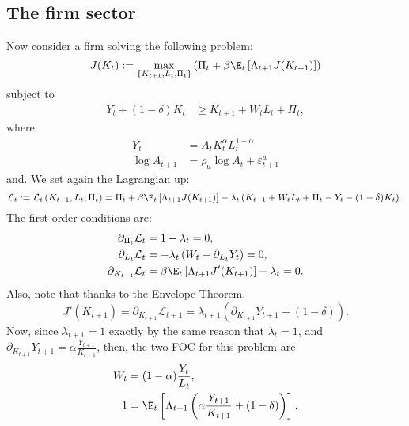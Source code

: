 \documentclass{article}
\begin{document}
	\subsection{The firm sector}
	Now consider a firm solving the following problem:
	\begin{equation}
		J(K_t) : = \max_{\{K_{t+1}, L_t, \Pi_t\}} \left(\Pi_t + \beta \E_t\left[\Lambda_{t+1} J(K_{t+1})\right]\right)
	\end{equation}
	subject to
	\begin{align}
		Y_t + (1-\delta)K_t&\geq K_{t+1} + W_t L_t + \Pi_t,\label{eq:RBC-GK_bank_constraint}
	\end{align}
	where
	 \begin{align}
	 	Y_t &= A_t K_{t}^\alpha L_t^{1-\alpha}\label{eq:RBC-GK_Y}\\
	 	\log A_{t+1} & = \rho_a \log A_{t} + \varepsilon_{t+1}^a\label{eq:RBC-GK_A}
	 \end{align}
	 and. We set again the Lagrangian up:
	\begin{equation}
		\mathcal{L}_t := \mathcal{L}_t\left(K_{t+1}, L_t, \Pi_t\right) = \Pi_t + \beta \E_t\left[\Lambda_{t+1} J(K_{t+1})\right] - \lambda_t \left(K_{t+1} + W_t L_t + \Pi_t - Y_t - (1-\delta)K_t\right).
	\end{equation}
	The first order conditions are:
	\begin{align}
		\partial_{\Pi_t} \mathcal{L}_t&= 1 - \lambda_t = 0, \label{FOC:RBC-GK_firm_1_1} \\
		\partial_{L_t} \mathcal{L}_t & = -\lambda_t\left(W_t - \partial_{L_t} Y_t\right) = 0, \label{FOC:RBC-GK_firm_1_2} \\
		\partial_{K_{t+1}} \mathcal{L}_t & = \beta\E_t\left[\Lambda_{t+1}J'(K_{t+1})\right]-\lambda_t  = 0. \label{FOC:RBC-GK_firm_1_3}
	\end{align}
	Also, note that thanks to the Envelope Theorem,
	\begin{equation}
		J'(K_{t+1}) = \partial_{K_{t+1}}\mathcal{L}_{t+1} = \lambda_{t+1}\left(\partial_{K_{t+1}}Y_{t+1} + (1-\delta)\right).
	\end{equation}
	Now, since $\lambda_{t+1}=1$ exactly by the same reason that $\lambda_t = 1$, and $\partial_{K_{t+1}} Y_{t+1} = \alpha \frac{Y_{t+1}}{K_{t+1}}$, then, the two FOC for this problem are
	\begin{align}
		W_t &= (1-\alpha)\frac{Y_t}{L_t}, \label{FOC:RBC-GK_firm_2_1} \\
		1  & = \E_t\left[\Lambda_{t+1}\left(\alpha\frac{Y_{t+1}}{K_{t+1}} + (1-\delta)\right)\right]. \label{FOC:RBC-GK_firm_2_2}
	\end{align}
\end{document}
